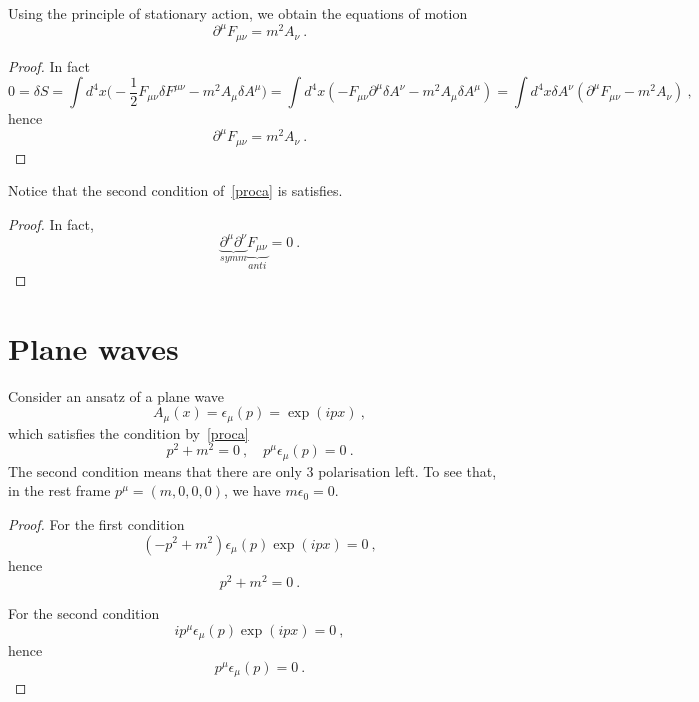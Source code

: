     Using the principle of stationary action, we obtain the equations of motion 
    \begin{equation*}
        \partial^\mu F_{\mu\nu} = m^2 A_\nu ~.
    \end{equation*}
    \begin{proof}
        In fact 
        \begin{equation*}
            0 = \delta S = \int d^4 x \Big (- \frac{1}{2} F_{\mu\nu} \delta F^{\mu\nu} - m^2 A_\mu \delta A^\mu \Big ) = \int d^4 x (-F_{\mu\nu} \partial^\mu \delta A^\nu - m^2 A_\mu \delta A^\mu) = \int d^4 x \delta A^\nu (\partial^\mu F_{\mu\nu} - m^2 A_\nu) ~,
        \end{equation*}
        hence 
        \begin{equation*}
            \partial^\mu F_{\mu\nu} = m^2 A_\nu ~.
        \end{equation*}
    \end{proof}

    Notice that the second condition of~\eqref{proca} is satisfies. 
    \begin{proof}
        In fact, 
        \begin{equation*}
            \underbrace{\partial^\mu \partial^\nu}_{symm} \underbrace{F_{\mu\nu}}_{anti} = 0~.
        \end{equation*}
    \end{proof}

\section{Plane waves} 

    Consider an ansatz of a plane wave 
    \begin{equation*}
        A_\mu (x) = \epsilon_\mu (p) = \exp(i p x) ~,
    \end{equation*}
    which satisfies the condition by~\eqref{proca} 
    \begin{equation*}
        p^2 + m^2 = 0 ~, \quad p^\mu \epsilon_\mu (p) = 0~.
    \end{equation*}
    The second condition means that there are only $3$ polarisation left. To see that, in the rest frame $p^\mu = (m, 0, 0, 0)$, we have $m \epsilon_0 = 0$.
    \begin{proof}
        For the first condition 
        \begin{equation*}
            (- p^2 + m^2) \epsilon_\mu (p) \exp(i p x) = 0 ~,
        \end{equation*}
        hence 
        \begin{equation*}
            p^2 + m^2 = 0~.
        \end{equation*}

        For the second condition
        \begin{equation*}
            i p^\mu \epsilon_\mu (p) \exp(ipx) = 0 ~,
        \end{equation*}
        hence
        \begin{equation*}
            p^\mu \epsilon_\mu (p) = 0~.
        \end{equation*}
    \end{proof}

